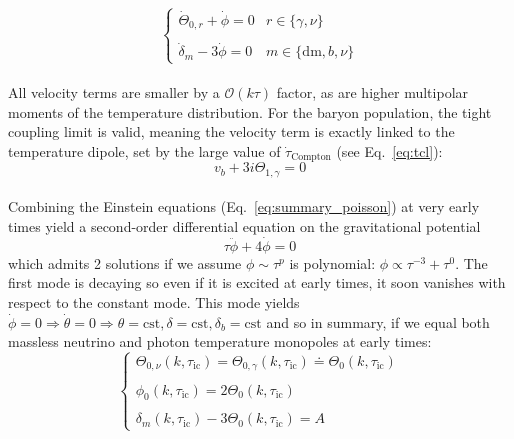 \begin{equation}
\left\{ \begin{array}{ll}
\dot{\Theta}_{0, r} + \dot{\phi} = 0 & r \in \lbrace \gamma, \nu \rbrace \\
\\
\dot{\delta}_m - 3 \dot{\phi} = 0 & m \in \lbrace \mathrm{dm}, b, \nu \rbrace
\end{array}
\right.
\end{equation} \\

All velocity terms are smaller by a $\mathcal{O}(k \tau)$ factor, as are higher multipolar moments of the temperature distribution. For the baryon population, the tight coupling limit is valid, meaning the velocity term is exactly linked to the temperature dipole, set by the large value of $\dot{\tau}_{\mathrm{Compton}}$ (see Eq.~\ref{eq:tcl}): \\

\begin{equation}
v_b + 3 i \Theta_{1, \gamma} = 0
\end{equation} \\

Combining the Einstein equations (Eq.~\ref{eq:summary_poisson}) at very early times yield a second-order differential equation on the gravitational potential \\

\begin{equation}
\tau \ddot{\phi} + 4 \dot{\phi} = 0 
\end{equation} which admits 2 solutions if we assume $\phi \sim \tau^p$ is polynomial: $\phi \propto \tau^{-3} + \tau^0$. The first mode is decaying so even if it is excited at early times, it soon vanishes with respect to the constant mode. This mode yields $\dot{\phi} = 0 \Rightarrow \dot{\theta} = 0 \Rightarrow \theta = \mathrm{cst}, \delta = \mathrm{cst}, \delta_b = \mathrm{cst}$ and so in summary, if we equal both massless neutrino and photon temperature monopoles at early times: \\

\begin{equation}
\left\{
\begin{array}{l}
\Theta_{0, \nu} (k, \tau_{\mathrm{ic}}) = \Theta_{0, \gamma} (k, \tau_{\mathrm{ic}}) \doteq \Theta_{0} (k, \tau_{\mathrm{ic}}) \\
\\
\phi_0 (k, \tau_{\mathrm{ic}})  = 2 \Theta_{0} (k, \tau_{\mathrm{ic}}) \\
\\
\delta_m (k, \tau_{\mathrm{ic}}) - 3 \Theta_0 (k, \tau_{\mathrm{ic}}) = A
\end{array}
\right.
\end{equation} \\


